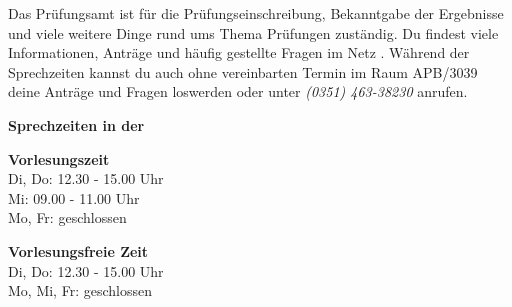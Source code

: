 \label{sec:pruefungsamt}
Das Prüfungsamt ist für die Prüfungseinschreibung, Bekanntgabe der Ergebnisse und viele weitere Dinge rund ums Thema Prüfungen zuständig. 
Du findest viele Informationen, Anträge und häufig gestellte Fragen im Netz . 
Während der Sprechzeiten kannst du auch ohne vereinbarten Termin im Raum APB/3039 deine Anträge und Fragen loswerden oder unter \textit{(0351) 463-38230} anrufen.

\textbf{Sprechzeiten in der}

\begin{multicols}{2}
\textbf{Vorlesungszeit} \\
Di, Do: 12.30 - 15.00 Uhr\\
Mi: 09.00 - 11.00 Uhr\\
Mo, Fr: geschlossen	

\textbf{Vorlesungsfreie Zeit} \\
Di, Do: 12.30 - 15.00 Uhr\\
Mo, Mi, Fr: geschlossen
\end{multicols}
